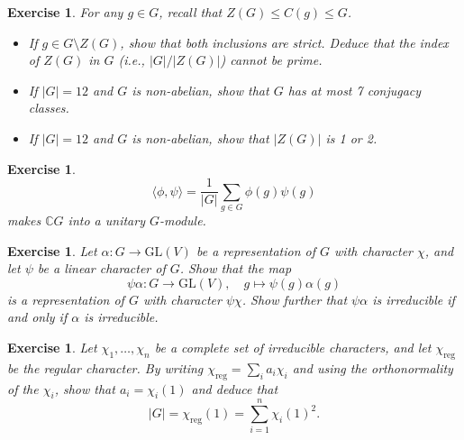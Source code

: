 \documentclass{article}
\newtheorem{exercise}[theorem]{Exercise}
\begin{document}
\begin{exercise}
For any \( g \in G \), recall that \( Z(G) \leq C(g) \leq G \).
    \begin{itemize}
        \item[(a)] If \( g \in G \setminus Z(G) \), show that both inclusions are strict. Deduce that the index of \( Z(G) \) in \( G \) (i.e., \( |G|/|Z(G)| \)) cannot be prime.
        \item[(b)] If \( |G| = 12 \) and \( G \) is non-abelian, show that \( G \) has at most 7 conjugacy classes.
        \item[(c)] If \( |G| = 12 \) and \( G \) is non-abelian, show that \( |Z(G)| \) is 1 or 2.
    \end{itemize}
\end{exercise}
    

\begin{exercise}
\[
\langle \phi, \psi \rangle = \frac{1}{|G|} \sum_{g \in G} \phi(g) \psi(g)
\]
makes \( \mathbb{C}G \) into a unitary \( G \)-module.
\end{exercise}

\begin{exercise}
Let \( \alpha: G \to \mathrm{GL}(V) \) be a representation of \( G \) with character \( \chi \), and let \( \psi \) be a linear character of \( G \). Show that the map
\[
\psi \alpha: G \to \mathrm{GL}(V), \quad g \mapsto \psi(g) \alpha(g)
\]
is a representation of \( G \) with character \( \psi \chi \). Show further that \( \psi \alpha \) is irreducible if and only if \( \alpha \) is irreducible.
\end{exercise}

\begin{exercise}
Let \( \chi_1, \ldots, \chi_n \) be a complete set of irreducible characters, and let \( \chi_{\text{reg}} \) be the regular character. By writing \( \chi_{\text{reg}} = \sum_i a_i \chi_i \) and using the orthonormality of the \( \chi_i \), show that \( a_i = \chi_i(1) \) and deduce that
\[
|G| = \chi_{\text{reg}}(1) = \sum_{i=1}^n \chi_i(1)^2.
\]
\end{exercise}
\end{document}
